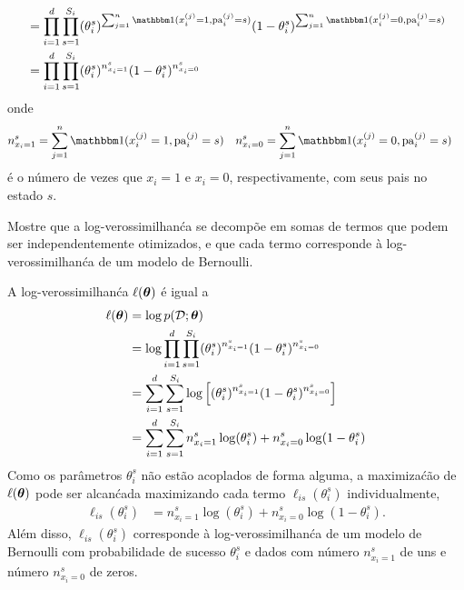 \begin{exenumerate}
\begin{solution}
\begin{align}
            & = \prod_{i=1}^d \prod_{s=1}^{S_i} (\theta_i^s)^{ \sum_{j=1}^n \ind(x_i^{(j)}=1, \pa_i^{(j)}=s)} (1-\theta_i^s)^{ \sum_{j=1}^n\ind(x_i^{(j)}=0, \pa_i^{(j)}=s)}\\
            & =  \prod_{i=1}^d \prod_{s=1}^{S_i}  (\theta_i^s)^{n_{x_i=1}^s} (1-\theta_i^s)^{n_{x_i=0}^s}
        \end{align}
        onde
        \begin{align}
            n_{x_i=1}^s &=  \sum_{j=1}^n\ind(x_i^{(j)}=1, \pa_i^{(j)}=s) & n_{x_i=0}^s &=  \sum_{j=1}^n\ind(x_i^{(j)}=0, \pa_i^{(j)}=s)
        \end{align}
        \'e o n\'umero de vezes que $x_i=1$ e $x_i=0$, respectivamente, com seus pais no estado $s$.
        
    \end{solution}
    
    \item \label{q:loglik-fully-observed-dgm-sum-bernoulli-alt}Mostre que a log-verossimilhan\'ca se decomp\~oe em somas de termos que podem ser independentemente otimizados, e que cada termo corresponde \`a log-verossimilhan\'ca de um modelo de Bernoulli.
    
    \begin{solution}
        A log-verossimilhan\'ca $\ell(\boldsymbol{\theta})$ \'e igual a
        \begin{align}
            \ell(\boldsymbol{\theta}) & = \log p(\mathcal{D}; \boldsymbol{\theta}) \\
            & = \log \prod_{i=1}^d \prod_{s=1}^{S_i}  (\theta_i^s)^{n_{x_i=1}^s} (1-\theta_i^s)^{n_{x_i=0}^s}\\
            & = \sum_{i=1}^d \sum_{s=1}^{S_i} \log \left[  (\theta_i^s)^{n_{x_i=1}^s} (1-\theta_i^s)^{n_{x_i=0}^s} \right]\\
            & = \sum_{i=1}^d \sum_{s=1}^{S_i} n_{x_i=1}^s \log (\theta_i^s) + n_{x_i=0}^s \log (1-\theta_i^s)
        \end{align}
        Como os par\^ametros $\theta_i^s$ n\~ao est\~ao acoplados de forma alguma, a maximiza\'c\~ao de $\ell(\boldsymbol{\theta})$ pode ser alcan\'cada maximizando cada termo $\ell_{is}(\theta_i^s)$ individualmente,
        \begin{align}
            \ell_{is}(\theta_i^s) & = n_{x_i=1}^s \log (\theta_i^s) + n_{x_i=0}^s \log (1-\theta_i^s).
        \end{align}
        Al\'em disso, $\ell_{is}(\theta_i^s)$ corresponde \`a log-verossimilhan\'ca de um modelo de Bernoulli com probabilidade de sucesso $\theta_i^s$ e dados com n\'umero $n_{x_i=1}^s$ de uns e n\'umero $n_{x_i=0}^s$ de zeros.
        

\end{solution}
\end{exenumerate}
